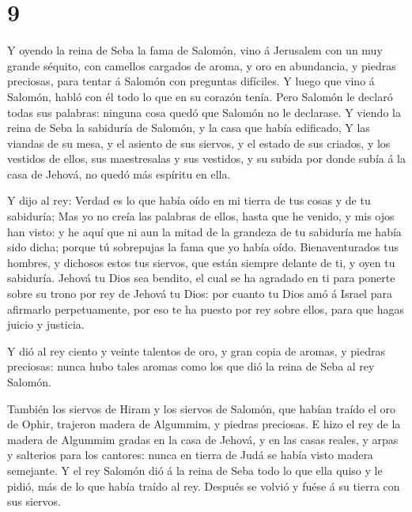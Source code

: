 \hypertarget{section-8}{%
\section{9}\label{section-8}}

 Y oyendo la reina de Seba la fama de Salomón, vino á
Jerusalem con un muy grande séquito, con camellos cargados de aroma, y
oro en abundancia, y piedras preciosas, para tentar á Salomón con
preguntas difíciles. Y luego que vino á Salomón, habló con él todo lo
que en su corazón tenía.  Pero Salomón le declaró todas
sus palabras: ninguna cosa quedó que Salomón no le declarase.
 Y viendo la reina de Seba la sabiduría de Salomón, y la
casa que había edificado,  Y las viandas de su mesa, y el
asiento de sus siervos, y el estado de sus criados, y los vestidos de
ellos, sus maestresalas y sus vestidos, y su subida por donde subía á la
casa de Jehová, no quedó más espíritu en ella.

 Y dijo al rey: Verdad es lo que había oído en mi tierra
de tus cosas y de tu sabiduría;  Mas yo no creía las
palabras de ellos, hasta que he venido, y mis ojos han visto: y he aquí
que ni aun la mitad de la grandeza de tu sabiduría me había sido dicha;
porque tú sobrepujas la fama que yo había oído. 
Bienaventurados tus hombres, y dichosos estos tus siervos, que están
siempre delante de ti, y oyen tu sabiduría.  Jehová tu
Dios sea bendito, el cual se ha agradado en ti para ponerte sobre su
trono por rey de Jehová tu Dios: por cuanto tu Dios amó á Israel para
afirmarlo perpetuamente, por eso te ha puesto por rey sobre ellos, para
que hagas juicio y justicia.

 Y dió al rey ciento y veinte talentos de oro, y gran
copia de aromas, y piedras preciosas: nunca hubo tales aromas como los
que dió la reina de Seba al rey Salomón.

 También los siervos de Hiram y los siervos de Salomón,
que habían traído el oro de Ophir, trajeron madera de Algummim, y
piedras preciosas.  E hizo el rey de la madera de
Algummim gradas en la casa de Jehová, y en las casas reales, y arpas y
salterios para los cantores: nunca en tierra de Judá se había visto
madera semejante.  Y el rey Salomón dió á la reina de
Seba todo lo que ella quiso y le pidió, más de lo que había traído al
rey. Después se volvió y fuése á su tierra con sus siervos.

